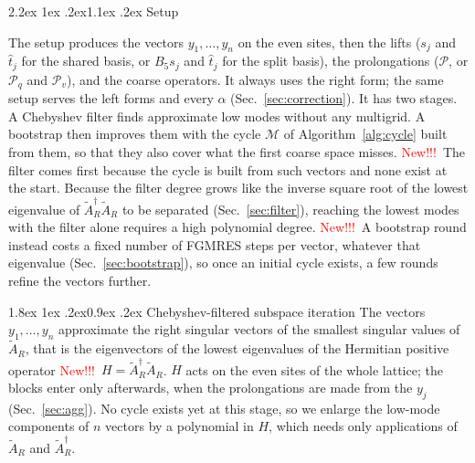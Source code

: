 \documentclass[11pt,a4paper]{article}
\makeatletter
\newcounter{alg}
\newif\ifshownew \shownewtrue
\DeclareRobustCommand\New{\ifshownew\textcolor{red}{New!!!}\ \else\ignorespaces\fi}
\renewcommand\subsection{\@startsection{subsection}{2}{\z@}%
  {2.2ex \@plus 1ex \@minus .2ex}{1.1ex \@plus .2ex}%
  {\centering\normalfont\small\bfseries}}
\renewcommand\subsubsection{\@startsection{subsubsection}{3}{\z@}%
  {1.8ex \@plus 1ex \@minus .2ex}{0.9ex \@plus .2ex}%
  {\centering\normalfont\small\bfseries\itshape}}
\numberwithin{equation}{section}
\newcommand{\dg}{^{\dagger}}
\newcommand{\AR}{\tilde A_{R}}
\newcommand{\Pro}{\mathcal P}
\newcommand{\Pq}{\Pro_q}
\newcommand{\Pv}{\Pro_v}
\makeatother
\begin{document}
\subsection{Setup}
\label{sec:setup}

The setup produces the vectors $y_1,\dots,y_n$ on the even sites, then the lifts
($s_j$ and $\hat t_j$ for the shared basis, or $B_5s_j$ and $\hat t_j$ for the split basis), the
prolongations ($\Pro$, or $\Pq$ and $\Pv$), and the coarse operators. It always uses the right form; the same
setup serves the left forms and every $\alpha$ (Sec.~\ref{sec:correction}). It has two stages.
A Chebyshev filter finds approximate low modes without any multigrid. A bootstrap then improves
them with the cycle $\mathcal M$ of Algorithm~\ref{alg:cycle} built from them, so that they also
cover what the first coarse space misses.
\New The filter comes first because the cycle is built from such vectors and none exist at the
start. Because the filter degree grows like the inverse square root of the lowest eigenvalue of
$\AR\dg\AR$ to be separated (Sec.~\ref{sec:filter}), reaching the lowest modes with the filter
alone requires a high polynomial degree. \New A bootstrap round instead costs a fixed number of
FGMRES steps per vector, whatever that eigenvalue (Sec.~\ref{sec:bootstrap}), so once an initial
cycle exists, a few rounds refine the vectors further.

\subsubsection{Chebyshev-filtered subspace iteration}
\label{sec:filter}
The vectors $y_1,\dots,y_n$ approximate the right singular vectors of the smallest singular values of $\AR$,
that is the eigenvectors of the lowest eigenvalues of the Hermitian positive operator \New $H=\AR\dg\AR$.
$H$ acts on the even sites of the whole lattice; the blocks enter only
afterwards, when the prolongations are made from the $y_j$ (Sec.~\ref{sec:agg}). No cycle exists yet at this
stage, so we enlarge the low-mode components of $n$ vectors by a polynomial in $H$, which
needs only applications of $\AR$ and $\AR\dg$.
\end{document}
